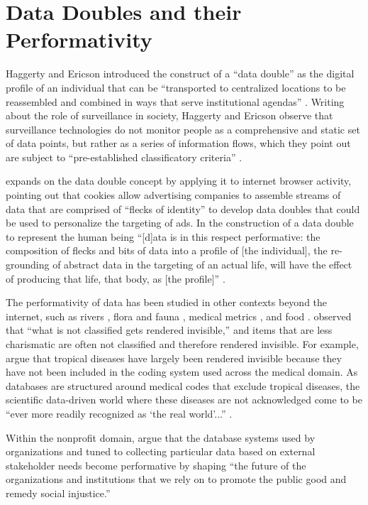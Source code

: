 \section{Data Doubles and their Performativity}
Haggerty and Ericson introduced the construct of a “data double” as the digital profile of an individual that can be “transported to centralized locations to be reassembled and combined in ways that serve institutional agendas” \citep{Haggerty2006New}. Writing about the role of surveillance in society, Haggerty and Ericson observe that surveillance technologies do not monitor people as a comprehensive and static set of data points, but rather as a series of information flows, which they point out are subject to “pre-established classificatory criteria” \citep{Haggerty2006New}. 

\cite{Raley2013Dataveillance} expands on the data double concept by applying it to internet browser activity, pointing out that cookies allow advertising companies to assemble streams of data that are comprised of “flecks of identity” \citep{Fuller2005Media} to develop data doubles that could be used to personalize the targeting of ads. In the construction of a data double to represent the human being “[d]ata is in this respect performative: the composition of flecks and bits of data into a profile of [the individual], the re-grounding of abstract data in the targeting of an actual life, will have the effect of producing that life, that body, as [the profile]” \citep{Raley2013Dataveillance}.

The performativity of data has been studied in other contexts beyond the internet, such as rivers \citep{Ribes2013DataBite}, flora and fauna \citep{Bowker2000Bio}, medical metrics \citep{Pine2015Politics}, and food \citep{Voida2017Currencies}. \cite{Bowker2000Bio} observed that “what is not classified gets rendered invisible,” and items that are less charismatic are often not classified and therefore rendered invisible. For example, \cite{Bowker2000Sorting} argue that tropical diseases have largely been rendered invisible because they have not been included in the coding system used across the medical domain. As databases are structured around medical codes that exclude tropical diseases, the scientific data-driven world where these diseases are not acknowledged come to be “ever more readily recognized as ‘the real world’...” \citep{Bowker2000Bio}.

Within the nonprofit domain, \cite{Voida2017Currencies} argue that the database systems used by organizations and tuned to collecting particular data based on external stakeholder needs become performative by shaping “the future of the organizations and institutions that we rely on to promote the public good and remedy social injustice.” 

